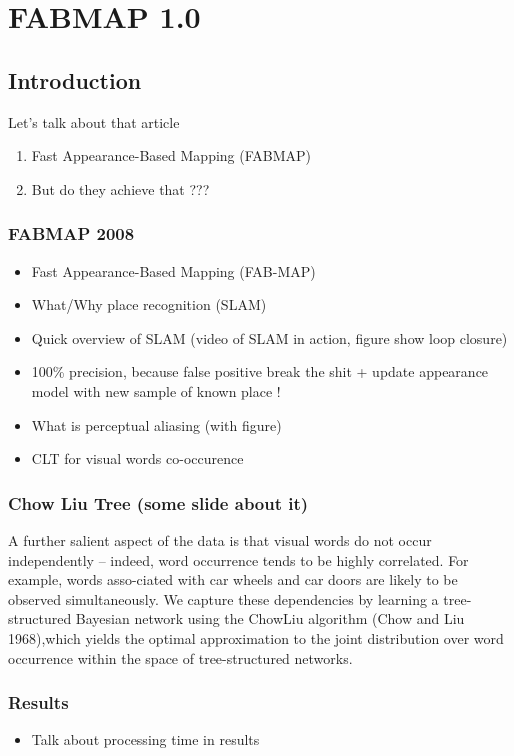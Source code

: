 \section{FABMAP 1.0}

\subsection{Introduction}
\begin{frame}{Let's talk about that article}
   \begin{enumerate}
       \item Fast Appearance-Based Mapping (FABMAP)
       \item But do they achieve that ???
   \end{enumerate} 
\end{frame}

\begin{frame}
    \frametitle{FABMAP 2008}
    \begin{itemize}
        \item Fast Appearance-Based Mapping (FAB-MAP)
        \item What/Why place recognition (SLAM)
        \item Quick overview of SLAM (video of SLAM in action, figure show loop closure)
        \item 100\% precision, because false positive break the shit + update appearance model with new sample of known place !
        \item What is perceptual aliasing (with figure)
        \item CLT for visual words co-occurence
    \end{itemize}
\end{frame}

\begin{frame}
    \frametitle{Chow Liu Tree (some slide about it)}
    A further salient aspect of the data is that visual words do not occur independently – indeed, word occurrence tends to be highly correlated. For example, words asso-ciated with car wheels and car doors are likely to be observed simultaneously. We capture these dependencies by learning a tree-structured Bayesian network using the ChowLiu algorithm (Chow and Liu 1968),which yields the optimal approximation to the joint distribution over word occurrence within the space of tree-structured networks.
\end{frame}

\begin{frame}
    \frametitle{Results}
    \begin{itemize}
        \item Talk about processing time in results
    \end{itemize}
\end{frame}
